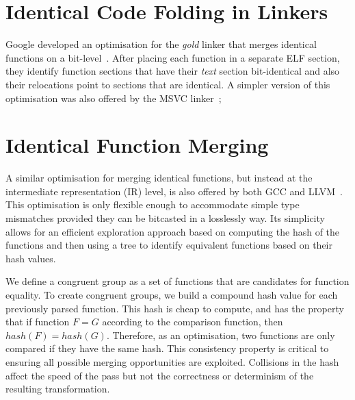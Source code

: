 
\section{Identical Code Folding in Linkers}

Google developed an optimisation for the \textit{gold} linker that merges
identical functions on a bit-level~\cite{tallam10,kwan12}.
After placing each function in a separate ELF section, they identify function
sections that have their \textit{text} section bit-identical and also their
relocations point to sections that are identical. A simpler version of this
optimisation was also offered by the MSVC linker~\cite{msvc-icf};

\section{Identical Function Merging}

A similar optimisation for merging identical functions, but instead at the
intermediate representation (IR) level, is also offered by both GCC and
LLVM~\cite{llvm-fm,livska14}.
This optimisation is only flexible enough to accommodate simple type mismatches
provided they can be bitcasted in a losslessly way.
Its simplicity allows for an efficient exploration approach based on computing
the hash of the functions and then using a tree to identify equivalent functions
based on their hash values.


We define a congruent group as a set of functions that are candidates for function
equality.
To create congruent groups, we build a compound hash value for each previously parsed function.
This hash is
cheap to compute, and has the property that if function $F = G$ according to
the comparison function, then $hash(F) = hash(G)$.
Therefore, as an optimisation, two functions are only compared if they have the
same hash.
This consistency property
is critical to ensuring all possible merging opportunities are exploited.
Collisions in the hash affect the speed of the pass but not the correctness
or determinism of the resulting transformation.

